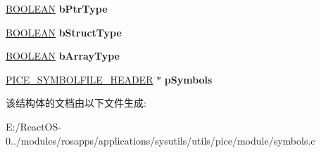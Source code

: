 \begin{DoxyCompactItemize}
\hyperlink{_processor_bind_8h_a112e3146cb38b6ee95e64d85842e380a}{B\+O\+O\+L\+E\+AN} {\bfseries b\+Ptr\+Type}
\item 
\mbox{\label{struct___v_r_e_t_affd52301d380a326e8ba4e278205ca17}} 
\hyperlink{_processor_bind_8h_a112e3146cb38b6ee95e64d85842e380a}{B\+O\+O\+L\+E\+AN} {\bfseries b\+Struct\+Type}
\item 
\mbox{\label{struct___v_r_e_t_a43ba9acfc7f2e6fa0f3f15768b4a4d48}} 
\hyperlink{_processor_bind_8h_a112e3146cb38b6ee95e64d85842e380a}{B\+O\+O\+L\+E\+AN} {\bfseries b\+Array\+Type}
\item 
\mbox{\label{struct___v_r_e_t_aa4ab945a46df598401afc37f2097f653}} 
\hyperlink{struct___p_i_c_e___s_y_m_b_o_l_f_i_l_e___h_e_a_d_e_r}{P\+I\+C\+E\+\_\+\+S\+Y\+M\+B\+O\+L\+F\+I\+L\+E\+\_\+\+H\+E\+A\+D\+ER} $\ast$ {\bfseries p\+Symbols}
\end{DoxyCompactItemize}


该结构体的文档由以下文件生成\+:\begin{DoxyCompactItemize}
\item 
E\+:/\+React\+O\+S-\/0../modules/rosapps/applications/sysutils/utils/pice/module/symbols.\+c\end{DoxyCompactItemize}
